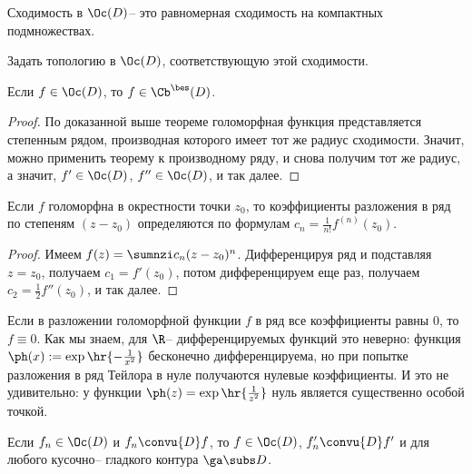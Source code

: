 \documentclass[a4paper]{article}
\begin{document}
\begin{df}
Сходимость в $\Oc(D)$-- это равномерная сходимость на компактных подмножествах.
\end{df}

\begin{problem}
Задать топологию в $\Oc(D)$, соответствующую этой сходимости.
\end{problem}

\begin{stm}
Если $f \in \Oc(D)$, то $f \in \Cb^\bes(D)$.
\end{stm}
\begin{proof}
По доказанной выше теореме голоморфная функция представляется степенным рядом, производная которого
имеет тот же радиус сходимости. Значит, можно применить теорему к производному ряду, и снова получим
тот же радиус, а значит, $f' \in \Oc(D)$, $f'' \in \Oc(D)$, и так далее.
\end{proof}

\begin{stm}
Если $f$ голоморфна в окрестности точки $z_0$, то коэффициенты разложения в ряд по степеням $(z-z_0)$
определяются по формулам $c_n  = \frac{1}{n!} f^{(n)}(z_0)$.
\end{stm}
\begin{proof}
Имеем $f(z) = \sumnzi c_n (z-z_0)^n$. Дифференцируя ряд и подставляя $z=z_0$,
получаем $c_1 = f'(z_0)$, потом дифференцируем еще раз, получаем $c_2 = \frac12 f''(z_0)$, и так далее.
\end{proof}

\begin{note}
Если в разложении голоморфной функции $f$ в ряд все коэффициенты равны $0$, то $f \equiv 0$. Как мы знаем,
для $\R$-- дифференцируемых функций это неверно: функция $\ph(x) := \exp\hr{-\frac{1}{x^2}}$ бесконечно дифференцируема,
но при попытке разложения в ряд Тейлора в нуле получаются нулевые коэффициенты. И это не удивительно: у функции
$\ph(z) = \exp \hr{\frac1{z^2}}$ нуль является существенно особой точкой.
\end{note}

\begin{theorem}[Вейерштрасса]
Если $f_n \in \Oc(D)$ и $f_n \convu{D} f$, то
$f \in \Oc(D)$, $f_n' \convu{D} f'$ и
для любого кусочно-- гладкого контура $\ga \subs D$.
\end{theorem}
\end{document}
